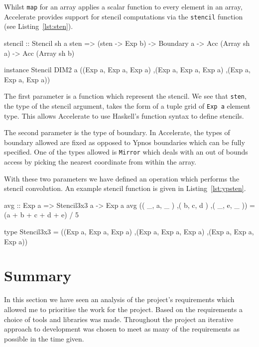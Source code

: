 \documentclass[
    12pt,
    a4paper,
    twoside,
    openright,
    ]{scrbook}
\begin{document}
Whilst \texttt{map} for an array applies a scalar function to every element in
an array, Accelerate provides support for stencil computations via the
\texttt{stencil} function (see Listing~\ref{lst:sten}).

\begin{hflisting}[label={lst:sten}, caption={The type of the stencil application
  function in Accelerate. Including an example instance of the
  \texttt{Stencil} type class. Many others are also possible.}]
stencil :: Stencil sh a sten =>
           (sten -> Exp b) ->
           Boundary a ->
           Acc (Array sh a) ->
           Acc (Array sh b)

instance Stencil DIM2 a ((Exp a, Exp a, Exp a)
                        ,(Exp a, Exp a, Exp a)
                        ,(Exp a, Exp a, Exp a))
\end{hflisting}

The first parameter is a function which represent the stencil. We see that
\texttt{sten}, the type of the stencil argument, takes the form of a tuple grid
of \texttt{Exp a} element type. This allows Accelerate to use Haskell's function
syntax to define stencils.

The second parameter is the type of boundary. In Accelerate, the types of
boundary allowed are fixed as opposed to Ypnos boundaries which can be fully
specified. One of the types allowed is \texttt{Mirror} which deals with an out
of bounds access by picking the nearest coordinate from within the array.

With these two parameters we have defined an operation which performs the
stencil convolution. An example stencil function is given in
Listing~\ref{lst:ypsten}.

\begin{hlisting}[label={lst:ypsten}, caption={The ``average'' stencil defined
  using Accelerate's syntax.}]
avg :: Exp a => Stencil3x3 a -> Exp a
avg (( _, a, _ )
    ,( b, c, d )
    ,( _, e, _ )) = (a + b + c + d + e) / 5

type Stencil3x3 = ((Exp a, Exp a, Exp a)
                  ,(Exp a, Exp a, Exp a)
                  ,(Exp a, Exp a, Exp a))
\end{hlisting}

\section{Summary}

In this section we have seen an analysis of the project's requirements which
allowed me to prioritise the work for the project. Based on the requirements a
choice of tools and libraries was made. Throughout the project an iterative
approach to development was chosen to meet as many of the requirements as
possible in the time given.
\end{document}
